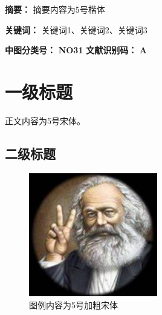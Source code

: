 \documentclass{CjC}
\begin{document}
\begin{center}

\vspace{10pt}


\vspace{10pt}

\end{center}

\vspace{10pt}

\songti

\textbf{摘要：} {\kaishu 摘要内容为5号楷体}

\textbf{关键词：} 关键词1、关键词2、关键词3

\textbf{中图分类号：} \textbf{NO31} \quad \textbf{文献识别码：} \textbf{A}

\vspace{10pt}

\section{一级标题}

正文内容为5号宋体\cite{chen2005zhulu}。

\subsection{二级标题}

\begin{figure}[h]
\centering
\includegraphics[width=0.5\textwidth]{pics/example.png}
\caption{图例内容为5号加粗宋体}
\end{figure}
\end{document}
